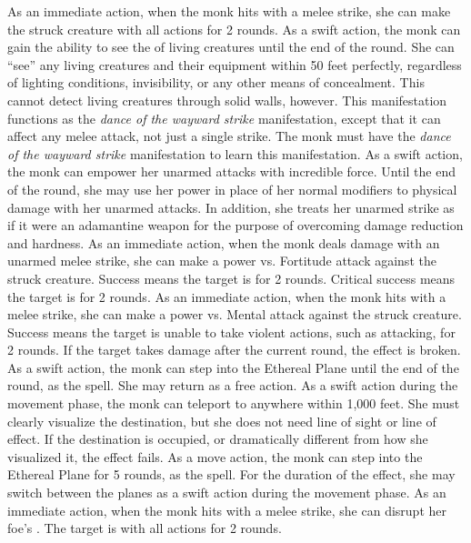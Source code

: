         As an immediate action, when the monk hits with a melee strike, she can make the struck creature \impaired with all actions for 2 rounds.
        As a swift action, the monk can gain the ability to see the \ki of living creatures until the end of the round.
        She can ``see'' any living creatures and their equipment within 50 feet perfectly, regardless of lighting conditions, invisibility, or any other means of concealment.
        This cannot detect living creatures through solid walls, however.
        This \ki manifestation functions as the \textit{dance of the wayward strike} manifestation, except that it can affect any melee attack, not just a single strike.
        The monk must have the \textit{dance of the wayward strike} \ki manifestation to learn this manifestation.
        As a swift action, the monk can empower her unarmed attacks with incredible force.
        Until the end of the round, she may use her \ki power in place of her normal modifiers to physical damage with her unarmed attacks.
        In addition, she treats her unarmed strike as if it were an adamantine weapon for the purpose of overcoming damage reduction and hardness.
        As an immediate action, when the monk deals damage with an unarmed melee strike, she can make a \Ki power vs. Fortitude attack against the struck creature.
        Success means the target is \staggered for 2 rounds.
        Critical success means the target is \stunned for 2 rounds.
        \norepeatnotes
        As an immediate action, when the monk hits with a melee strike, she can make a \Ki power vs. Mental attack against the struck creature.
        Success means the target is unable to take violent actions, such as attacking, for 2 rounds.
        If the target takes damage after the current round, the effect is broken.
        As a swift action, the monk can step into the Ethereal Plane until the end of the round, as the  spell.
        She may return as a free action.
        As a swift action during the movement phase, the monk can teleport to anywhere within 1,000 feet.
        She must clearly visualize the destination, but she does not need line of sight or line of effect.
        If the destination is occupied, or dramatically different from how she visualized it, the effect fails.
         As a move action, the monk can step into the Ethereal Plane for 5 rounds, as the 
        spell.
        For the duration of the effect, she may switch between the planes as a swift action during the movement phase.
        As an immediate action, when the monk hits with a melee strike, she can disrupt her foe's \ki.
        The target is \severelyimpaired with all actions for 2 rounds.

